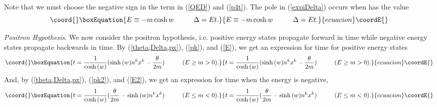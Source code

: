 \documentclass[a4paper,12pt]{article}
\begin{document}
Note that we must choose the negative sign in the \coordHE{} term in (\ref{QED}) and (\ref{p4t}). The pole in (\ref{expiDelta}) occurs when \coordHE{} has the value \coordHE{}
\begin{equation}\coord{}\boxEquation{	\label{E2}
E \equiv -m \cosh{w} \hspace{1cm} \Delta = Et.
}{	E \equiv -m \cosh{w} \hspace{1cm} \Delta = Et.
}{ecuacion}\coordE{}\end{equation} 

	{\textit{Positron Hypothesis}}. We now consider the positron hypothesis, i.e. positive energy states propagate forward in time while negative energy states propagate backwards in time. By (\ref{theta,Delta,px}), (\ref{pk}), and (\ref{E}), we get an expression for time \coordHE{} for positive energy states 
\begin{equation}\coord{}\boxEquation{	\label{poshyp}
t = \frac{1}{\cosh{(w)}} (\sinh{(w)}n^{k}x^{k} - \frac{\theta}{2m}) \hspace{1cm} (E \geq m > 0).
}{	t = \frac{1}{\cosh{(w)}} (\sinh{(w)}n^{k}x^{k} - \frac{\theta}{2m}) \hspace{1cm} (E \geq m > 0).
}{ecuacion}\coordE{}\end{equation}
And, by (\ref{theta,Delta,px}), (\ref{pk2}), and (\ref{E2}), we get an expression for time \coordHE{} when the energy is negative, 
\begin{equation}\coord{}\boxEquation{	\label{neghyp}
t = \frac{1}{\cosh{(w)}} (\frac{\theta}{2m} - \sinh{(w)}n^{k}x^{k} ) \hspace{1cm} (E \leq m < 0).
}{	t = \frac{1}{\cosh{(w)}} (\frac{\theta}{2m} - \sinh{(w)}n^{k}x^{k} ) \hspace{1cm} (E \leq m < 0).
}{ecuacion}\coordE{}\end{equation}
\end{document}

